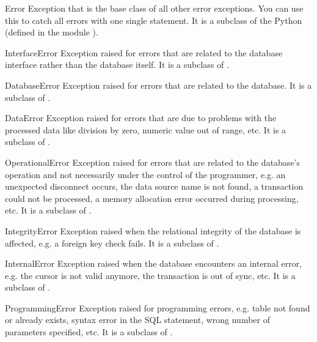 \begin{excdesc}{Error}
Exception that is the base class of all other error exceptions.  You
can use this to catch all errors with one single 
statement.  It is a subclass of the Python 
(defined in the module ).
\end{excdesc}

\begin{excdesc}{InterfaceError}
Exception raised for errors that are related to the database interface
rather than the database itself.  It is a subclass of .
\end{excdesc}

\begin{excdesc}{DatabaseError}
Exception raised for errors that are related to the database.  It is a
subclass of .
\end{excdesc}

\begin{excdesc}{DataError}
Exception raised for errors that are due to problems with the
processed data like division by zero, numeric value out of range,
etc.  It is a subclass of .
\end{excdesc}

\begin{excdesc}{OperationalError}
Exception raised for errors that are related to the database's
operation and not necessarily under the control of the programmer,
e.g. an unexpected disconnect occurs, the data source name is not
found, a transaction could not be processed, a memory allocation error
occurred during processing, etc.  It is a subclass of
.
\end{excdesc}

\begin{excdesc}{IntegrityError}
Exception raised when the relational integrity of the database is
affected, e.g. a foreign key check fails.  It is a subclass of
.
\end{excdesc}

\begin{excdesc}{InternalError}
Exception raised when the database encounters an internal error,
e.g. the cursor is not valid anymore, the transaction is out of sync,
etc.  It is a subclass of .
\end{excdesc}

\begin{excdesc}{ProgrammingError}
Exception raised for programming errors, e.g. table not found or
already exists, syntax error in the SQL statement, wrong number of
parameters specified, etc.  It is a subclass of .
\end{excdesc}


